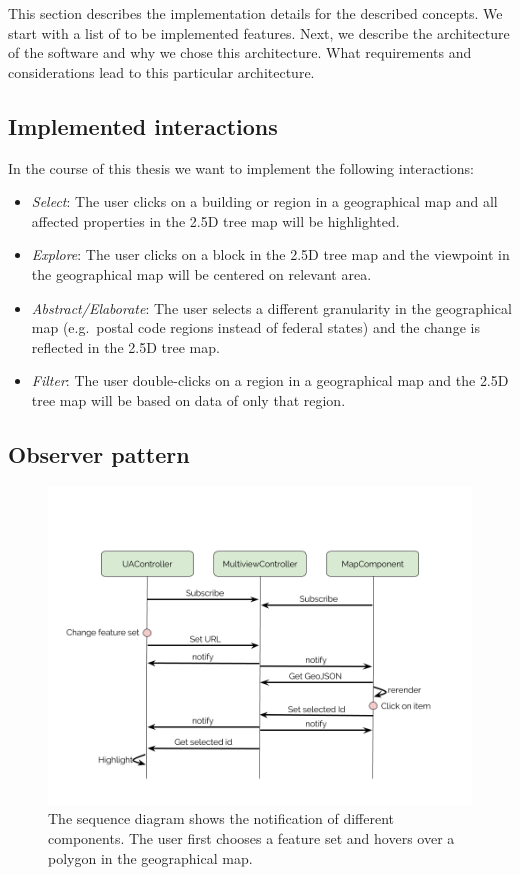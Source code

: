 \documentclass{article}
\newcommand{\tmap}{\textsc{2.5D} tree map}
\begin{document}
This section describes the implementation details for the described concepts.
We start with a list of to be implemented features.
Next, we describe the architecture of the software and why we chose this architecture.
What requirements and considerations lead to this particular architecture.


\subsection{Implemented interactions}

In the course of this thesis we want to implement the following interactions:
\begin{itemize}
  \item
    \emph{Select}: The user clicks on a building or region in a geographical map and all affected properties in the \tmap{} will be highlighted.
  \item
    \emph{Explore}: The user clicks on a block in the \tmap{} and the viewpoint in the geographical map will be centered on relevant area.
  \item
    \emph{Abstract/Elaborate}: The user selects a different granularity in the geographical map (e.g.\ postal code regions instead of federal states) and the change is reflected in the \tmap{}.
  \item
    \emph{Filter}: The user double-clicks on a region in a geographical map and the \tmap{} will be based on data of only that region.
\end{itemize}

\subsection{Observer pattern}
\begin{figure}[h!]
  \centering
  \includegraphics[width=\textwidth]{images/sequence-diagram.png}
  \caption{%
    The sequence diagram shows the notification of different components.
  The user first chooses a feature set and hovers over a polygon in the geographical map.
  }\label{fig:implementation:sequence-diagram}
\end{figure}
\end{document}
